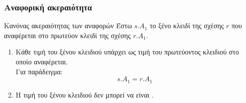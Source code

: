 \begin{frame}[t, fragile]
\frametitle{Αναφορική ακεραιότητα}
\begin{minipage}{0.94\textwidth}
  \begin{block}{Κανόνας ακεραιότητας των αναφορών}
    Έστω $s.A_1$ το ξένο κλειδί της σχέσης $r$ που αναφέρεται στο πρωτεύον κλειδί
    της σχέσης $r.A_1$.
    \begin{enumerate}
      \item Κάθε τιμή του ξένου κλειδιού υπάρχει ως τιμή του πρωτεύοντος κλειδιού
            στο οποίο αναφέρεται. \\
            Για παράδειγμα:
            \[ s.A_1 = r.A_1\]
      \item Η τιμή του ξένου κλειδιού δεν μπορεί να είναι \tnull.      
    \end{enumerate}
  \end{block} 
\end{minipage} 
\end{frame}


